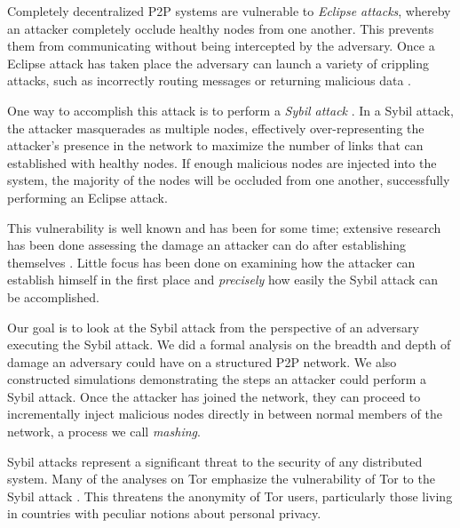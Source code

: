 \documentclass[11pt,conference]{IEEEtran}
\begin{document}
Completely decentralized P2P systems are vulnerable to \textit{Eclipse attacks}, whereby an attacker completely occlude healthy nodes from one another.
This prevents them from communicating without being intercepted by the adversary.
Once a Eclipse attack has taken place the adversary can launch a variety of crippling attacks, such as incorrectly routing messages or returning malicious data \cite{srivatsa2004vulnerabilities}.

One way to accomplish this attack is to perform a \emph{Sybil attack} \cite{sybil}.
In a Sybil attack, the attacker masquerades as multiple nodes, effectively over-representing the attacker's presence in the network to maximize the number of links that can established with healthy nodes.
If enough malicious nodes are injected into the system, the majority of the nodes will be occluded from one another, successfully performing an Eclipse attack.

This vulnerability is well known and has been for some time; extensive research has been done assessing the damage an attacker can do after establishing themselves \cite{srivatsa2004vulnerabilities}.
Little focus has been done on examining how the attacker can establish himself in the first place and \textit{precisely} how easily the Sybil attack can be accomplished.

Our goal is to look at the Sybil attack from the perspective of an adversary executing the Sybil attack.
We did a formal analysis on the breadth and depth of damage an adversary could have on a structured P2P network.
We also constructed simulations demonstrating the steps an attacker could perform a Sybil attack.
Once the attacker has joined the network, they can proceed to incrementally inject malicious nodes directly in between normal members of the network, a process we call \textit{mashing}.

Sybil attacks represent a significant threat to the security of any distributed system.
Many of the analyses on Tor \cite{dingledine2004tor} emphasize the vulnerability of Tor to the Sybil attack \cite{bauer2007low}.
This threatens the anonymity of Tor users, particularly those living in countries with peculiar notions about personal privacy.
\end{document}
